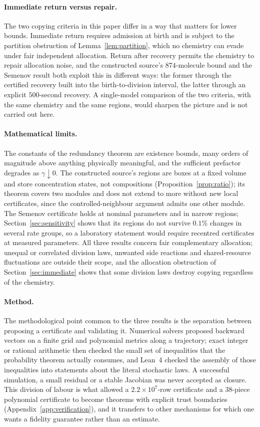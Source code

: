 \paragraph{Immediate return versus repair.}
The two copying criteria in this paper differ in a way that matters for lower bounds. Immediate return requires admission at birth and is subject to the partition obstruction of Lemma~\ref{lem:partition}, which no chemistry can evade under fair independent allocation. Return after recovery permits the chemistry to repair allocation noise, and the constructed source's $874$-molecule bound and the Semenov result both exploit this in different ways: the former through the certified recovery built into the birth-to-division interval, the latter through an explicit $500$-second recovery. A single-model comparison of the two criteria, with the same chemistry and the same regions, would sharpen the picture and is not carried out here.

\paragraph{Mathematical limits.}
The constants of the redundancy theorem are existence bounds, many orders of magnitude above anything physically meaningful, and the sufficient prefactor degrades as $\gamma\downarrow0$. The constructed source's regions are boxes at a fixed volume and store concentration states, not compositions (Proposition~\ref{prop:ratio}); its theorem covers two modules and does not extend to more without new local certificates, since the controlled-neighbour argument admits one other module. The Semenov certificate holds at nominal parameters and in narrow regions; Section~\ref{sec:sensitivity} shows that its regions do not survive $0.1\%$ changes in several rate groups, so a laboratory statement would require recentred certificates at measured parameters. All three results concern fair complementary allocation; unequal or correlated division laws, unwanted side reactions and shared-resource fluctuations are outside their scope, and the allocation obstruction of Section~\ref{sec:immediate} shows that some division laws destroy copying regardless of the chemistry.

\paragraph{Method.}
The methodological point common to the three results is the separation between proposing a certificate and validating it. Numerical solvers proposed backward vectors on a finite grid and polynomial metrics along a trajectory; exact integer or rational arithmetic then checked the small set of inequalities that the probability theorem actually consumes, and Lean~4 checked the assembly of those inequalities into statements about the literal stochastic laws. A successful simulation, a small residual or a stable Jacobian was never accepted as closure. This division of labour is what allowed a $2.2\times10^7$-row certificate and a $38$-piece polynomial certificate to become theorems with explicit trust boundaries (Appendix~\ref{app:verification}), and it transfers to other mechanisms for which one wants a fidelity guarantee rather than an estimate.
